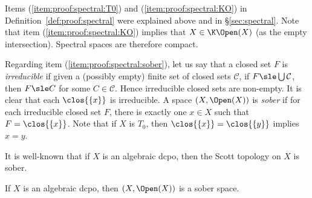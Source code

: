 Items (\ref{item:proof:spectral:T0})
and (\ref{item:proof:spectral:KO}) in Definition~\ref{def:proof:spectral}
were explained above and in \S\ref{sec:spectral}.
Note that item (\ref{item:proof:spectral:KO})
implies that $X \in \K\Open(X)$ (as the empty intersection).
Spectral spaces are therefore compact.

Regarding item (\ref{item:proof:spectral:sober}),
let us say that a closed set $F$ is \emph{irreducible}
if given a (possibly empty) finite set of closed sets $\mathcal{C}$,
if $F \sle \bigcup \mathcal{C}$,
then $F \sle C$ for some $C \in \mathcal{C}$.
Hence irreducible closed sets are non-empty.
It is clear that each $\clos{\{x\}}$ is irreducible.
A space $(X, \Open(X))$ is \emph{sober} if for each irreducible closed set $F$,
there is exactly one $x \in X$ such that $F = \clos{\{x\}}$.
Note that if $X$ is $T_0$,
then $\clos{\{x\}} = \clos{\{y\}}$ implies $x = y$.

It is well-known that if $X$ is an algebraic dcpo,
then the Scott topology on $X$ is sober.

\begin{lemma}
\label{lem:proof:spectral:sober}
If $X$ is an algebraic dcpo, then $(X,\Open(X))$ is a sober space.
\end{lemma}

